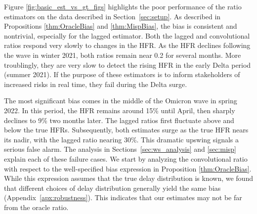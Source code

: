 \documentclass{article}
\newcommand{\djmcomment}[1]{{\color{teal}[DJM: #1]}}
\begin{document}
Figure \ref{fig:basic_est_vs_gt_figs} highlights the poor performance of the ratio estimators on the data described in Section~\ref{sec:setup}. 
As described in Propositions \ref{thm:OracleBias} and \ref{thm:MispBias}, the bias is consistent and nontrivial, especially for the lagged estimator.
Both the lagged and convolutional ratios respond very slowly to
changes in the HFR. As the HFR declines following the wave in winter 2021, both
ratios remain near 0.2 for several months. More troublingly, they are very slow
to detect the rising HFR in the early Delta period (summer 2021). %
If the purpose of these estimators is to inform stakeholders of increased risks
in real time, they fail during the Delta surge.

The most significant bias comes in the middle of the Omicron wave in spring 2022. 
In this period, the HFR remains around 15\% until April, then sharply declines to 9\% two months later. The lagged ratios first fluctuate above and below the true HFRs. Subsequently, both estimates surge as the true HFR nears its nadir, with the lagged ratio nearing 30\%. This dramatic upswing signals a serious false alarm. 
The analysis in Sections~\ref{sec:ws_analysis} and \ref{sec:misp} explain each
of these failure cases. We start by analyzing the convolutional ratio with
respect to the well-specified bias expression in Proposition \ref{thm:OracleBias}.
While this expression assumes that the true delay distribution is known, we found
that different choices of delay distribution generally yield the same bias
(Appendix~\ref{apx:robustness}). This indicates that our estimates may not be far
from the oracle ratio.
\end{document}
